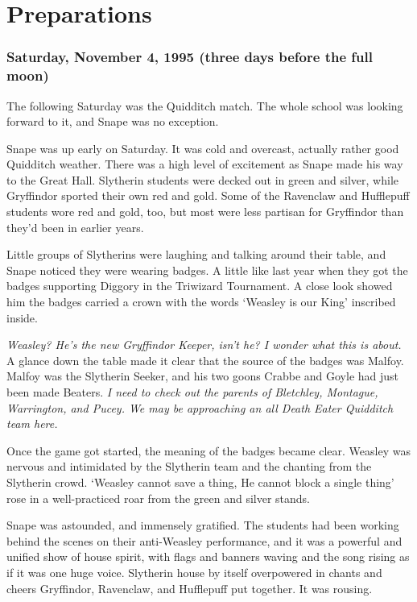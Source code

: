 
\chapter{Preparations}

\subsection{Saturday, November 4, 1995 (three days before the full moon)}

The following Saturday was the Quidditch match. The whole school was looking forward to it, and Snape was no exception.

Snape was up early on Saturday. It was cold and overcast, actually rather good Quidditch weather. There was a high level of excitement as Snape made his way to the Great Hall. Slytherin students were decked out in green and silver, while Gryffindor sported their own red and gold. Some of the Ravenclaw and Hufflepuff students wore red and gold, too, but most were less partisan for Gryffindor than they'd been in earlier years.

Little groups of Slytherins were laughing and talking around their table, and Snape noticed they were wearing badges. A little like last year when they got the badges supporting Diggory in the Triwizard Tournament. A close look showed him the badges carried a crown with the words `Weasley is our King' inscribed inside.

\emph{Weasley? He's the new Gryffindor Keeper, isn't he? I wonder what this is about.} A glance down the table made it clear that the source of the badges was Malfoy. Malfoy was the Slytherin Seeker, and his two goons Crabbe and Goyle had just been made Beaters. \emph{I need to check out the parents of Bletchley, Montague, Warrington, and Pucey. We may be approaching an all Death Eater Quidditch team here.}

Once the game got started, the meaning of the badges became clear. Weasley was nervous and intimidated by the Slytherin team and the chanting from the Slytherin crowd. `Weasley cannot save a thing, He cannot block a single thing{\el}' rose in a well-practiced roar from the green and silver stands.

Snape was astounded, and immensely gratified. The students had been working behind the scenes on their anti-Weasley performance, and it was a powerful and unified show of house spirit, with flags and banners waving and the song rising as if it was one huge voice. Slytherin house by itself overpowered in chants and cheers Gryffindor, Ravenclaw, and Hufflepuff put together. It was rousing.

